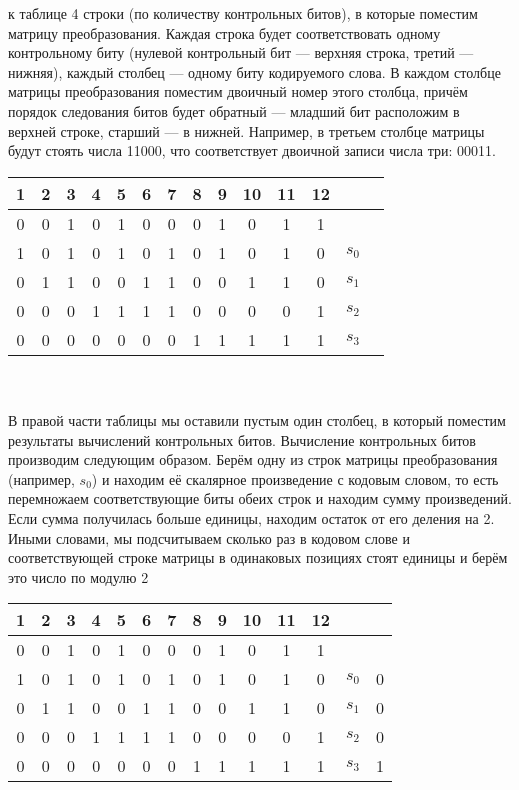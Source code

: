 \documentclass[a4paper,12pt]{article}
\begin{document}
 к таблице 4 строки (по количеству контрольных битов), в которые поместим матрицу преобразования. Каждая строка будет соответствовать одному контрольному биту (нулевой контрольный бит — верхняя строка, третий — нижняя), каждый столбец — одному биту кодируемого слова. В каждом столбце матрицы преобразования поместим двоичный номер этого столбца, причём порядок следования битов будет обратный — младший бит расположим в верхней строке, старший — в нижней. Например, в третьем столбце матрицы будут стоять числа 11000, что соответствует двоичной записи числа три: 00011.\\
\begin{table}[!h]
\begin{center}
\begin{tabular}{|c|c|c|c|c|c|c|c|c|c|c|c|c|c|}
\hline
1&2&3&4&5&6&7&8&9&10&11&12&&\\
\hline
\cellcolor{Red}0&\cellcolor{Red}0&1&\cellcolor{Red}0&1&0&0&\cellcolor{Red}0&1&0&1&1&&\\
\hline
1&0&1&0&1&0&1&0&1&0&1&0&$s_0$&\\
\hline
0&1&1&0&0&1&1&0&0&1&1&0&$s_1$&\\
\hline
0&0&0&1&1&1&1&0&0&0&0&1&$s_2$&\\
\hline
0&0&0&0&0&0&0&1&1&1&1&1&$s_3$&\\
\hline
\end{tabular}
\end{center}
\end{table}\\
\\
В правой части таблицы мы оставили пустым один столбец, в который поместим результаты вычислений контрольных битов. Вычисление контрольных битов производим следующим образом. Берём одну из строк матрицы преобразования (например, $s_0$) и находим её скалярное произведение с кодовым словом, то есть перемножаем соответствующие биты обеих строк и находим сумму произведений. Если сумма получилась больше единицы, находим остаток от его деления на 2. Иными словами, мы подсчитываем сколько раз в кодовом слове и соответствующей строке матрицы в одинаковых позициях стоят единицы и берём это число по модулю 2\\
\begin{table}[!h]
\begin{center}
\begin{tabular}{|c|c|c|c|c|c|c|c|c|c|c|c|c|c|}
\hline
1&2&3&4&5&6&7&8&9&10&11&12&&\\
\hline
\cellcolor{Red}0&\cellcolor{Red}0&1&\cellcolor{Red}0&1&0&0&\cellcolor{Red}0&1&0&1&1&&\\
\hline
1&0&1&0&1&0&1&0&1&0&1&0&$s_0$&0\\
\hline
0&1&1&0&0&1&1&0&0&1&1&0&$s_1$&0\\
\hline
0&0&0&1&1&1&1&0&0&0&0&1&$s_2$&0\\
\hline
0&0&0&0&0&0&0&1&1&1&1&1&$s_3$&1\\
\hline
\end{tabular}
\end{center}
\end{table}\\
\end{document}
